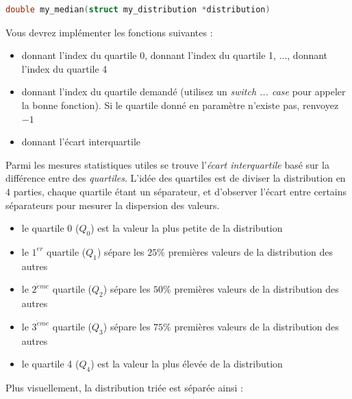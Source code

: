\documentclass[11pt,a4paper]{article}
\begin{document}
\medskip

\begin{lstlisting}[language=C,morekeywords={floor,ceil}]
double my_median(struct my_distribution *distribution) \end{lstlisting}




Vous devrez implémenter les fonctions suivantes :

\begin{itemize}
\item {} donnant l'index du quartile 0,  donnant l'index du quartile 1, ...,  donnant l'index du quartile 4
\item {} donnant l'index du quartile demandé (utilisez un \textit{switch ... case} pour appeler la bonne fonction). Si le quartile donné en paramètre n'existe pas, renvoyez $ -1 $
\item {} donnant l'écart interquartile
\end{itemize}


Parmi les mesures statistiques utiles se trouve l'\textit{écart interquartile} basé sur la différence entre des \textit{quartiles}.
L'idée des quartiles est de diviser la distribution en $ 4 $ parties, chaque quartile étant un séparateur, et d'observer l'écart entre certains séparateurs pour mesurer la dispersion des valeurs.

\begin{itemize}
\item le quartile 0 ($Q_{0}$) est la valeur la plus petite de la distribution
\item le $ 1^{er} $ quartile ($Q_{1}$) sépare les $ 25\% $ premières valeurs de la distribution des autres
\item le $ 2^{\grave{e}me} $ quartile ($Q_{2}$) sépare les $ 50\% $ premières valeurs de la distribution des autres
\item le $ 3^{\grave{e}me} $ quartile ($Q_{3}$) sépare les $ 75\% $ premières valeurs de la distribution des autres
\item le quartile 4 ($Q_{4}$) est la valeur la plus élevée de la distribution
\end{itemize}

\newpage

Plus visuellement, la distribution triée est séparée ainsi :
\end{document}
